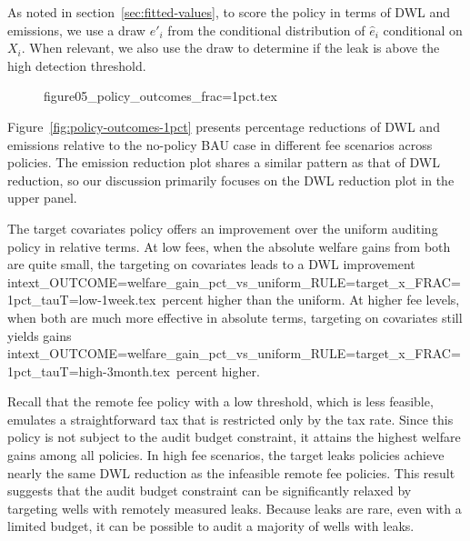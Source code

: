 As noted in section~\ref{sec:fitted-values}, to score the policy in terms of \gls{DWL} and emissions, we use a draw \(e'_i\) from the conditional distribution of \(\hat{e}_i\) conditional on \(X_i\).
When relevant, we also use the draw to determine if the leak is above the high detection threshold.

\begin{figure}[!bth] %
{figure05_policy_outcomes_frac=1pct.tex}
\end{figure}


Figure~\ref{fig:policy-outcomes-1pct} presents percentage reductions of \gls{DWL} and emissions relative to the no-policy \gls{BAU} case in different fee scenarios across policies.
The emission reduction plot shares a similar pattern as that of \gls{DWL} reduction, so our discussion primarily focuses on the \gls{DWL} reduction plot in the upper panel.

The target covariates policy offers an improvement over the uniform auditing policy in relative terms.
At low fees, when the absolute welfare gains from both are quite small, the
targeting on covariates leads to a \gls{DWL} improvement
{intext_OUTCOME=welfare_gain_pct_vs_uniform_RULE=target_x_FRAC=1pct_tauT=low-1week.tex}~percent
higher than the uniform.
At higher fee levels, when both are much more effective in absolute terms, targeting on covariates still yields gains
{intext_OUTCOME=welfare_gain_pct_vs_uniform_RULE=target_x_FRAC=1pct_tauT=high-3month.tex}~percent
higher.

Recall that the remote fee policy with a low threshold, which is less feasible, emulates a straightforward tax that is restricted only by the tax rate.
Since this policy is not subject to the audit budget constraint, it attains the highest welfare gains among all policies.
In high fee scenarios, the target leaks policies achieve nearly the same \gls{DWL} reduction as the infeasible remote fee policies.
This result suggests that the audit budget constraint can be significantly relaxed by targeting wells with remotely measured leaks.
Because leaks are rare, even with a limited budget, it can be possible to audit a majority of wells with leaks.

